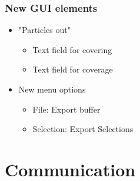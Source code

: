\subsubsection{New GUI elements}
\begin{itemize}[noitemsep,topsep=0pt]
\item "Particles out" %
\begin{itemize}[noitemsep,topsep=0pt]
\item Text field for covering
\item Text field for coverage
\end{itemize}
\item New menu options
\begin{itemize}[noitemsep,topsep=0pt]
\item File: Export buffer%
\item Selection: Export Selections
\end{itemize}
\end{itemize}

\section{Communication}
